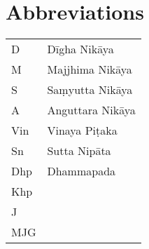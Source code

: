 \chapter*{Abbreviations}


\begin{tabular}{@{} l l @{}}
D & Dīgha Nikāya \\
M & Majjhima Nikāya \\
S & Saṃyutta Nikāya \\
A & Anguttara Nikāya \\
Vin & Vinaya Piṭaka \\
Sn & Sutta Nipāta \\
Dhp & Dhammapada \\
Khp & \\
J & \\
MJG & \\
\end{tabular}

%

